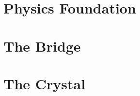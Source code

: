 \documentclass[12pt,a4paper]{book}
\begin{document}
% 

% 

% 

% 

\part{Physics Foundation}













\part{The Bridge}

% 

% 

% 

\part{The Crystal}

% 

% 

% 

% 

% 
\end{document}
